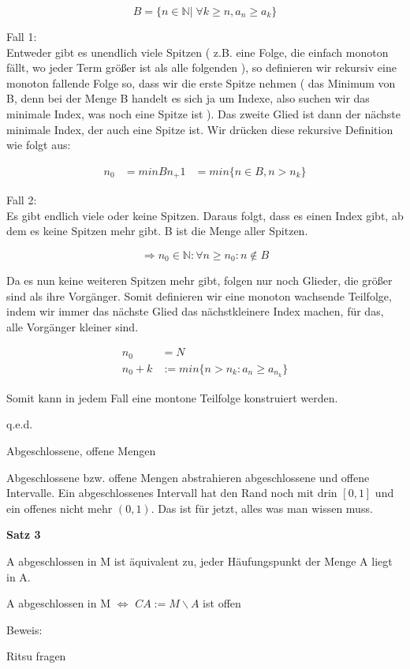 \documentclass[smallheadings,headsepline,12pt,a4paper]{scrartcl}
\begin{document}
$$ B= \{n \in \mathbb{N} | \; \forall k \geq n, a_n \geq a_k \} $$

Fall 1:\\
Entweder gibt es unendlich viele Spitzen ( z.B. eine Folge, die einfach monoton fällt, wo jeder Term größer ist als alle folgenden ), so definieren wir rekursiv eine monoton fallende Folge so, dass wir die erste Spitze nehmen ( das Minimum von B, denn bei der Menge B handelt es sich ja um Indexe, also suchen wir das minimale Index, was noch eine Spitze ist ). Das zweite Glied ist dann der nächste minimale Index, der auch eine Spitze ist. Wir drücken diese rekursive Definition wie folgt aus:

\begin{equation} 
 \begin{aligned} 
  n_0&= min B
  n_+1&= min\{n \in B, n > n_k \}
 \end{aligned} 
\end{equation}

Fall 2: \\
Es gibt endlich viele oder keine Spitzen. Daraus folgt, dass es einen Index gibt, ab dem es keine Spitzen mehr gibt. B ist die Menge aller Spitzen. 

$$ \Rightarrow n_0 \in \mathbb{N} : \forall n \geq n_0 : n \not \in B $$

Da es nun keine weiteren Spitzen mehr gibt, folgen nur noch Glieder, die größer sind als ihre Vorgänger. Somit definieren wir eine monoton wachsende Teilfolge, indem wir immer das nächste Glied das nächstkleinere Index machen, für das, alle Vorgänger kleiner sind. 

\begin{equation} 
 \begin{aligned} 
  n_0 &= N \\
  n_0+k &:= min\{n>n_k : a_n \geq a_{n_k}\}  
 \end{aligned} 
\end{equation}
 
Somit kann in jedem Fall eine montone Teilfolge konstruiert werden. \begin{flushright}
q.e.d. 
\end{flushright}

\begin{center}
\item[Abgeschlossene, offene Mengen]
\end{center}
\item Abgeschlossene bzw. offene Mengen abstrahieren abgeschlossene und offene Intervalle. Ein abgeschlossenes Intervall hat den Rand noch mit drin $ [0,1] $ und ein offenes nicht mehr $(0,1)$. Das ist für jetzt, alles was man wissen muss.
\item \textbf{Satz 3}
\item A abgeschlossen in M ist äquivalent zu, jeder Häufungspunkt der Menge A liegt in A. 
\item A abgeschlossen in M $\Leftrightarrow$ $CA := M\backslash A$ ist offen 
\item Beweis:\\
\item Ritsu fragen
\end{document}

